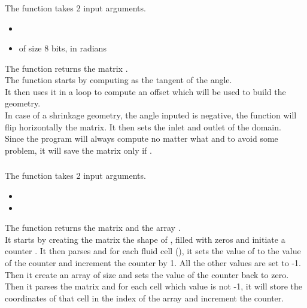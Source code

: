 \subsubsection{\textcolor{func}{}}
The function \textcolor{func}{} takes 2 input arguments.
\begin{itemize}
      \item {} \textcolor{dtype}{}
      \item {} of size 8 bits, in radians
\end{itemize}
The function returns the matrix .\\
The function starts by computing  as the tangent of the angle.\\
It then uses it in a  loop to compute an offset which will be used to
build the geometry.\\
In case of a shrinkage geometry, the angle inputed is negative, the function
will flip horizontally the matrix. It then sets the inlet and outlet of the
domain.\\
Since the program will always compute  no matter what and to avoid some
problem, it will save the matrix only if .

\subsubsection{\textcolor{func}{}}
The function \textcolor{func}{} takes 2 input arguments.
\begin{itemize}
      \item {}
      \item {} 
\end{itemize}
The function returns the matrix  and the array .\\
It starts by creating the matrix  the shape of , filled with zeros
and initiate a counter . It then parses  and for each fluid
cell (), it sets the value of  to the value of the
counter and increment the counter by 1. All the other values are set to -1.\\
Then it create an array  of size  and
sets the value of the counter back to zero. Then it parses the matrix 
and for each cell which value is not -1, it will store the coordinates of that
cell in the index  of the array  and increment the
counter.

